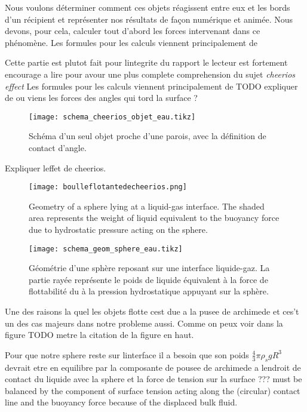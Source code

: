     Nous voulons déterminer comment ces objets réagissent entre eux et les bords d'un récipient et représenter nos résultats de façon numérique et animée. Nous devons, pour cela, calculer tout d'abord les forces intervenant dans ce phénomène. Les formules pour les calculs viennent principalement de \cite{vella_cheerios_2005}     


    Cette partie est plutot fait pour lintegrite du rapport le lecteur est fortement encourage a lire \cite{vella_cheerios_2005} pour avour une plus complete comprehension du sujet \textit{cheerios effect}
    Les formules pour les calculs viennent principalement de \cite{vella_cheerios_2005}
    TODO expliquer de ou viens les forces des angles qui tord la surface ?

    \begin{figure}[!htb]
        \centering
        \texttt{[image: schema\_cheerios\_objet\_eau.tikz]}
        \caption{Schéma d'un seul objet proche d'une parois, avec la définition de contact d'angle.}
        \label{test}
    \end{figure}

    Expliquer leffet de cheerios.
    
    \begin{figure}
        \texttt{[image: boulleflotantedecheerios.png]}
        \caption{Geometry of a sphere lying at a liquid-gas interface. The shaded area represents the weight of liquid equivalent to the buoyancy force due to hydrostatic pressure acting on the sphere.\cite{vella_cheerios_2005}}
    \end{figure}
    \begin{figure}[!htb]
        \centering
        \texttt{[image: schema\_geom\_sphere\_eau.tikz]}
        \caption{Géométrie d'une sphère reposant sur une interface liquide-gaz. La partie rayée représente le poids de liquide équivalent à la force de flottabilité du à la pression hydrostatique appuyant sur la sphère. }
        \label{geom_sphere}
    \end{figure}
    Une des raisons la quel les objets flotte cest due a la pusee de archimede et ces't un des cas majeurs dans notre probleme aussi. Comme on peux voir dans la figure TODO metre la citation de la figure en haut.
    
    Pour que notre sphere reste sur linterface il a besoin que son poids \(\frac{4}{3}\pi\rho_{s}gR^3\) devrait etre en equilibre par la composante de pousee de archimede a lendroit de contact du liquide avec la sphere et la force de tension sur la surface ??? must be balanced by the component of surface tension acting along the (circular) contact line and the buoyancy force because of the displaced bulk fluid.

